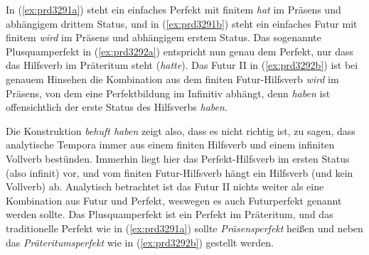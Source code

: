 \begin{exe}
  \ex\label{ex:prd3291} 
  \begin{xlist}
  \end{xlist}
  \ex\label{ex:prd3292} 
  \begin{xlist}
  \end{xlist}
\end{exe}

In (\ref{ex:prd3291a}) steht ein einfaches Perfekt mit finitem \textit{hat} im Präsens und abhängigem drittem Status, und in (\ref{ex:prd3291b}) steht ein einfaches Futur mit finitem \textit{wird} im Präsens und abhängigem erstem Status.
Das sogenannte Plusquamperfekt in (\ref{ex:prd3292a}) entspricht nun genau dem Perfekt, nur dass das Hilfsverb im Präteritum steht (\textit{hatte}).
Das Futur II in (\ref{ex:prd3292b}) ist bei genauem Hinsehen die Kombination aus dem finiten Futur-Hilfsverb \textit{wird} im Präsens, von dem eine Perfektbildung im Infinitiv abhängt, denn \textit{haben} ist offensichtlich der erste Status des Hilfsverbs \textit{haben}.


Die Konstruktion \textit{behuft haben} zeigt also, dass es nicht richtig ist, zu sagen, dass analytische Tempora immer aus einem finiten Hilfsverb und einem infiniten Vollverb bestünden.
Immerhin liegt hier das Perfekt-Hilfsverb im ersten Status (also infinit) vor, und vom finiten Futur-Hilfsverb hängt ein Hilfsverb (und kein Vollverb) ab.
Analytisch betrachtet ist das Futur II nichts weiter als eine Kombination aus Futur und Perfekt, weswegen es auch Futurperfekt genannt werden sollte.
Das Plusquamperfekt ist ein Perfekt im Präteritum, und das traditionelle Perfekt wie in (\ref{ex:prd3291a}) sollte \textit{Präsensperfekt} heißen und neben das \textit{Präteritumsperfekt} wie in (\ref{ex:prd3292b}) gestellt werden.


